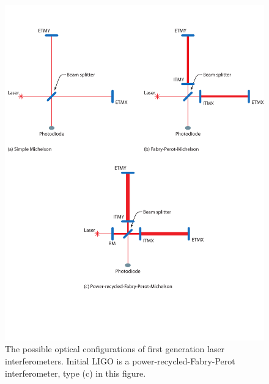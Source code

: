 \begin{figure}[p]
\label{f:ifodesign}
\begin{center}
\includegraphics[width=\linewidth]{figures/inspiral/ifoconfigs}
\end{center}
\caption[Optical Configuration of LIGO]{%
The possible optical configurations of first generation laser interferometers.
Initial LIGO is a power-recycled-Fabry-Perot interferometer, type (c) in this
figure.
}
\end{figure}

